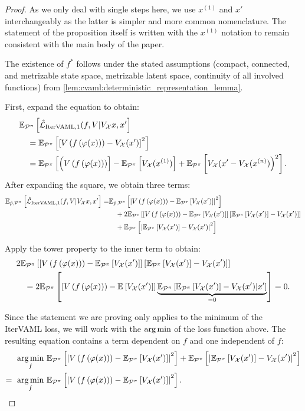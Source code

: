 \begin{proof}

As we only deal with single steps here, we use $x^{(1)}$ and $x'$ interchangeably as the latter is simpler and more common nomenclature.
The statement of the proposition itself is written with the $x^{(1)}$ notation to remain consistent with the main body of the paper.

The existence of $f^*$ follows under the stated assumptions (compact, connected, and metrizable state space, metrizable latent space, continuity of all involved functions) from \autoref{lem:cvaml:deterministic_representation_lemma}.

First, expand the equation to obtain:
\begin{align}
     &\mathbb{E}_{\mathcal{P}^\pi}\left[  \hat{\mathcal{L}}_{\text{IterVAML}, 1}(f, V | V_\mathcal{X} x, x'  \right] \\
    &\quad = \mathbb{E}_{\mathcal{P}^\pi}\left[  \left[ V\left( f\left( \varphi(x) \right) \right) - V_\mathcal{X}(x') \right]^2 \right]\\
    &\quad = \mathbb{E}_{\mathcal{P}^\pi}\left[  \Bigl(V\left( f\left( \varphi(x) \right) \right) \right] - \mathbb{E}_{\mathcal{P}^\pi}\left[  V_\mathcal{X}(x^{(1)}) \right] + \mathbb{E}_{\mathcal{P}^\pi}\left[  V_\mathcal{X}(x' - V_\mathcal{X}(x^{(n)}) \Bigr)^2 \right].
\end{align}
After expanding the square, we obtain three terms:
\begin{align}
     \mathbb{E}_{\hat{p},\mathcal{P}^\pi}\left[  \hat{\mathcal{L}}_{\text{IterVAML}, 1}(f, V | V_\mathcal{X} x, x'  \right] =
      &\mathbb{E}_{\hat{p},\mathcal{P}^\pi}\left[  \left|{V\left( f\left( \varphi(x) \right) \right) - \mathbb{E}_{\mathcal{P}^\pi}\left[  V_\mathcal{X}(x') \right]}\right|^2 \right] \\
    &\quad + 2 \mathbb{E}_{\mathcal{P}^\pi}\left[  \left[ V\left( f\left( \varphi(x) \right) \right) - \mathbb{E}_{\mathcal{P}^\pi}\left[  V_\mathcal{X}(x') \right] \right]\left[ \mathbb{E}_{\mathcal{P}^\pi}\left[  V_\mathcal{X}(x') \right] - V_\mathcal{X}(x')  \right] \right]\\
    &\quad + \mathbb{E}_{\mathcal{P}^\pi}\left[  \left|{\mathbb{E}_{\mathcal{P}^\pi}\left[  V_\mathcal{X}(x') \right] - V_\mathcal{X}(x') }\right|^2 \right]
\end{align}

Apply the tower property to the inner term to obtain: 
\begin{align}
&2\mathbb{E}_{\mathcal{P}^\pi}\left[  \left[ V\left( f\left( \varphi(x) \right) \right) - \mathbb{E}_{\mathcal{P}^\pi}\left[  V_\mathcal{X}(x') \right] \right]\left[ \mathbb{E}_{\mathcal{P}^\pi}\left[  V_\mathcal{X}(x') \right] - V_\mathcal{X}(x')  \right] \right]\\
&\quad =2\mathbb{E}_{\mathcal{P}^\pi}\left[  \left[ V\left( f\left( \varphi(x) \right) \right) - \mathbb{E}_{}\left[  V_\mathcal{X}(x') \right] \right]\underbrace{\mathbb{E}_{\mathcal{P}^\pi}\left[  \mathbb{E}_{\mathcal{P}^\pi}\left[  V_\mathcal{X}(x') \right] - V_\mathcal{X}(x') \middle|x' \right]}_{=0} \right] = 0.
\end{align}

Since the statement we are proving only applies to the minimum of the IterVAML loss, we will work with the $\operatorname*{arg\,min}$ of the loss function above.
The resulting equation contains a term dependent on $f$ and one independent of $f$:
\begin{align}
    \operatorname*{arg\,min}_f~ & \mathbb{E}_{\mathcal{P}^\pi}\left[  \left|{V\left( f\left( \varphi(x) \right) \right) - \mathbb{E}_{\mathcal{P}^\pi}\left[  V_\mathcal{X}(x') \right]}\right|^2 \right] + \mathbb{E}_{\mathcal{P}^\pi}\left[  \left|{\mathbb{E}_{\mathcal{P}^\pi}\left[  V_\mathcal{X}(x') \right] - V_\mathcal{X}(x') }\right|^2 \right]\\
    =~ \operatorname*{arg\,min}_f~ & \mathbb{E}_{\mathcal{P}^\pi}\left[  \left|{V\left( f\left( \varphi(x) \right) \right) - \mathbb{E}_{\mathcal{P}^\pi}\left[  V_\mathcal{X}(x') \right]}\right|^2 \right].
\end{align}


\end{proof}
